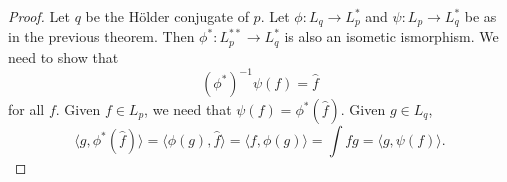 \begin{proof}
Let $q$ be the H\"older conjugate of $p$.
Let $\phi: L_q\to L_p^*$
and $\psi: L_p\to L_q^*$
be as in the previous theorem.
Then $\phi^*:L_p^{**}\to L_q^*$ is also an isometic ismorphism.
We need to show that
$$(\phi^*)^{-1}\psi(f)=\hat f$$
for all $f$.
Given $f\in L_p$, we need that $\psi(f)=\phi^*(\hat f)$. Given $g\in L_q$,
$$\langle g,\phi^*(\hat f)\rangle =\langle \phi(g),\hat f\rangle =\langle f,\phi(g)\rangle =\int fg =\langle g,\psi (f)\rangle.$$
\end{proof}




















%
